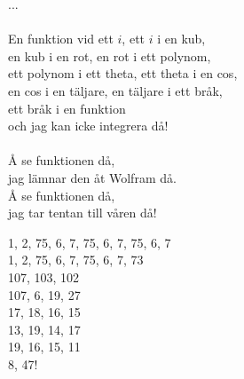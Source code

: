 \documentclass[a6paper, 10pt, twoside]{article}
\begin{document}
\begin{lyrics}
...\\
\vspace{1pt}\\
En funktion vid ett $i$, ett $i$ i en kub, \\
en kub i en rot, en rot i ett polynom, \\
ett polynom i ett theta, ett theta i en cos, \\
en cos i en täljare, en täljare i ett bråk, \\
ett bråk i en funktion \\
och jag kan icke integrera då! \\
\vspace{2pt}\\
Å se funktionen då, \\
jag lämnar den åt Wolfram då. \\
Å se funktionen då, \\
jag tar tentan till våren då! 
\end{lyrics}

\begin{center}
\end{center}
\begin{lyrics}
1, 2, 75, 6, 7, 75, 6, 7, 75, 6, 7\\
1, 2, 75, 6, 7, 75, 6, 7, 73\\
107, 103, 102\\
107, 6, 19, 27\\
17, 18, 16, 15\\
13, 19, 14, 17\\
19, 16, 15, 11\\
8, 47!
\end{lyrics}
\end{document}
